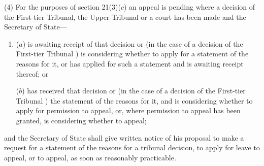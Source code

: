 \documentclass[12pt,a4paper]{article}
\begin{document}
%
%

(4) For the purposes of section 21(3)($c$)  an appeal is pending where a decision of 
the First-tier Tribunal, the Upper Tribunal  %
or a court has been made and the Secretary of State—
\begin{enumerate}\item[]
($a$) is awaiting receipt of that decision or (in the case of 
a decision of the First-tier Tribunal%
) is considering whether to apply for a statement of the reasons for it, or has applied for such a statement and is awaiting receipt thereof; or

($b$) has received that decision or (in the case of 
a decision of the First-tier Tribunal%
) the statement of the reasons for it, and is considering whether to apply for 
permission  %
to appeal, or, where 
permission  %
to appeal has been granted, is considering whether to appeal;
\end{enumerate}
and the Secretary of State shall give written notice of his proposal to make a request for a statement of the reasons for a tribunal decision, to apply for leave to appeal, or to appeal, as soon as reasonably practicable.
\end{document}
